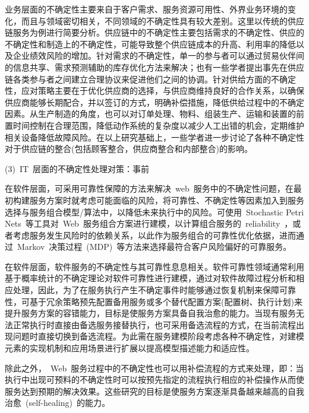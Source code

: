 业务层面的不确定性主要来自于客户需求、服务资源可用性、外界业务环境的变化，而且与领域密切相关，不同领域的不确定性具有较大差别。这里以传统的供应链服务为例进行简要分析。供应链中的不确定性主要包括需求的不确定性、供应的不确定性和制造上的不确定性，可能导致整个供应链成本的升高、利用率的降低以及企业绩效风险的增加。针对需求的不确定性，单一的参与者可以通过贸易伙伴间的信息共享、需求预测辅助的库存优化方法来解决；也有一些学者提出事先在供应链各类参与者之间建立合理协议来促进他们之间的协调。针对供给方面的不确定性，应对策略主要在于优化供应商的选择，与供应商维持良好的合作关系，以确保供应商能够长期配合，并以签订的方式，明确补偿措施，降低供给过程中的不确定因素。从生产制造的角度，也可以对订单处理、物料、组装生产、运输和装置的前置时间控制在合理范围，降低动作系统的复杂度以减少人工出错的机会，定期维护相关设备降低故障风险。在以上研究基础上，一些学者进一步讨论了各种不确定性对于供应链的整合(包括顾客整合，供应商整合和内部整合)的影响。

(3)~IT~层面的不确定性处理对策：事前

在软件层面，可采用可靠性保障的方法来解决~web~服务中的不确定性问题，在最初构建服务方案时就考虑可能面临的风险，将可靠性、不确定性等因素加入到服务选择与服务组合模型/算法中，以降低未来执行中的风险。可使用~Stochastic Petri Nets~等工具对~Web~服务组合方案进行建模，以计算组合服务的~reliability~，或者考虑服务发生风险时的依赖关系，以此作为服务组合的可靠性优化依据，进而通过~Markov~决策过程~(MDP)~等方法来选择最符合客户风险偏好的可靠服务。

在软件层面，软件服务的不确定性与其可靠性息息相关。软件可靠性领域通常利用基于概率统计的不确定理论对软件可靠性进行建模，通过对软件故障过程分析和相应处理，因此，为了在服务执行产生不确定事件时能够通过恢复机制来保障可靠性，可基于冗余策略预先配置备用服务或多个替代配置方案(配置树、执行计划)来提升服务方案的容错能力，目标是使服务方案具备自我治愈的能力。当现有服务无法正常执行时直接由备选服务接替执行，也可采用备选流程的方式，在当前流程出现问题时直接切换到备选流程。为此需在服务建模阶段考虑各种不确定性，对建模元素的实现机制和应用场景进行扩展以提高模型描述能力和适应性。

除此之外，~Web~服务过程中的不确定性也可以用补偿流程的方式来处理，即：当执行中出现可预料的不确定性时可以按预先指定的流程执行相应的补偿操作从而使服务达到预期的解决效果。这些研究的目标是使服务方案逐渐具备越来越高的自我治愈~(self-healing)~的能力。

